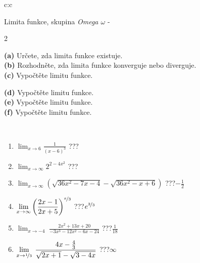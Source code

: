 \documentclass[10pt]{report}
\begin{document}
\newpage
\thispagestyle{empty}
\begin{tabular}{c:c}
\begin{minipage}[c][104.5mm][t]{0.5\linewidth}
\begin{center}
\vspace{7mm}
{\huge Limita funkce, skupina \textit{Omega $\omega$} -}\\[5mm]
\begin{minipage}{0.95\linewidth}
\begin{center}
{\small \begin{multicols}{2} \raggedright
\textbf{(a)} Určete, zda limita funkce existuje. \\[1mm]
\textbf{(b)} Rozhodněte, zda limita funkce konverguje nebo diverguje. \\[1mm]
\textbf{(c)} Vypočtěte limitu funkce. \par \columnbreak
\textbf{(d)} Vypočtěte limitu funkce. \\[1mm]
\textbf{(e)} Vypočtěte limitu funkce. \\[1mm]
\textbf{(f)} Vypočtěte limitu funkce. \\[1mm]
\end{multicols}
}
\end{center}
\end{minipage}
\\[4mm]
\begin{minipage}{0.79\linewidth}
\begin{center}
\begin{varwidth}{\linewidth}
\begin{enumerate}
\normalsize
\item $\displaystyle\lim_{x\to6}{\frac{1}{(x-6)^{3}}}$\quad \dotfill\; ???\;\dotfill \quad {}
\item $\displaystyle\lim_{x\to\infty}{2^{2-4x^2}}$\quad \dotfill\; ???\;\dotfill \quad {}
\item $\displaystyle\lim_{x\to\infty}{\left(\sqrt{36x^2-7x-4} - \sqrt{36x^2-x+6}\right)}$\quad \dotfill\; ???\;\dotfill \quad $-\frac{1}{2}$
\item $\displaystyle\lim_{x\to\infty}{\left( \frac{2x-1}{2x+5} \right)^{\nicefrac{x}{3}}}$\quad \dotfill\; ???\;\dotfill \quad $e^{\nicefrac{2}{3}}$
\item $\displaystyle\lim_{x\to -4}{\;\frac{2x^2+13x+20}{-3x^3-12x^2-6x-24}}$\quad \dotfill\; ???\;\dotfill \quad $\frac{1}{18}$
\item $\displaystyle\lim_{x\to \nicefrac{1}{3}}{\;\frac{4x-\frac{4}{3}}{\sqrt{2x+1} - \sqrt{3-4x}}}$\quad \dotfill\; ???\;\dotfill \quad $\infty$

\end{enumerate}
\end{varwidth}
\end{center}
\end{minipage}
\end{center}
\end{minipage}
\end{tabular}
\end{document}
